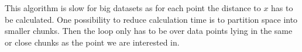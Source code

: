 This algorithm is slow for big datasets as for each point the distance to $x$ has to be calculated. One possibility to reduce calculation time is to partition space into smaller chunks. Then the loop only has to be over data points lying in the same or close chunks as the point we are interested in.
